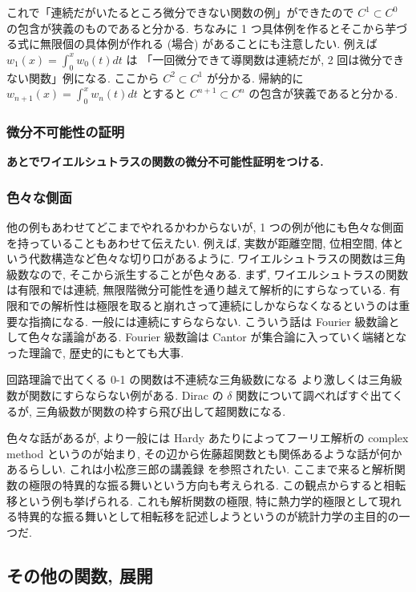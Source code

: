 \documentclass[openany, a4paper, oneside]{book}
\theoremstyle{break}
\theoremstyle{breakdefn}
\begin{document}
これで「連続だがいたるところ微分できない関数の例」ができたので $C^1 \subset C^0$ の包含が狭義のものであると分かる.
ちなみに 1 つ具体例を作るとそこから芋づる式に無限個の具体例が作れる (場合) があることにも注意したい.
例えば $w_1 (x)=\int_0^x w_0 (t) dt$ は
「一回微分できて導関数は連続だが, 2 回は微分できない関数」例になる.
ここから $C^2 \subset C^1$ が分かる.
帰納的に $w_{n+1}(x)=\int_0^x w_n (t) dt$ とすると $C^{n+1} \subset C^n$ の包含が狭義であると分かる.
\subsubsection{微分不可能性の証明}
\label{sec-11-3-6-1-1}

\textbf{あとでワイエルシュトラスの関数の微分不可能性証明をつける.}
\subsubsection{色々な側面}
\label{sec-11-3-6-1-2}

他の例もあわせてどこまでやれるかわからないが, 1 つの例が他にも色々な側面を持っていることもあわせて伝えたい.
例えば, 実数が距離空間, 位相空間, 体という代数構造など色々な切り口があるように.
ワイエルシュトラスの関数は三角級数なので, そこから派生することが色々ある.
まず, ワイエルシュトラスの関数は有限和では連続, 無限階微分可能性を通り越えて解析的にすらなっている.
有限和での解析性は極限を取ると崩れさって連続にしかならなくなるというのは重要な指摘になる.
一般には連続にすらならない.
こういう話は Fourier 級数論として色々な議論がある.
Fourier 級数論は Cantor が集合論に入っていく端緒となった理論で, 歴史的にもとても大事.

回路理論で出てくる 0-1 の関数は不連続な三角級数になる
より激しくは三角級数が関数にすらならない例がある.
Dirac の $\delta$ 関数について調べればすぐ出てくるが, 三角級数が関数の枠すら飛び出して超関数になる.

色々な話があるが, より一般には Hardy あたりによってフーリエ解析の complex method というのが始まり,
その辺から佐藤超関数とも関係あるような話が何かあるらしい.
これは小松彦三郎の講義録 \cite{HikosaburoKomatsu1} を参照されたい.
ここまで来ると解析関数の極限の特異的な振る舞いという方向も考えられる.
この観点からすると相転移という例も挙げられる.
これも解析関数の極限, 特に熱力学的極限として現れる特異的な振る舞いとして相転移を記述しようというのが統計力学の主目的の一つだ.
\subsection{その他の関数, 展開}
\label{sec-11-3-6-2}
\end{document}
